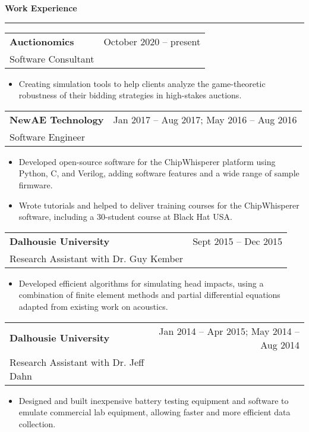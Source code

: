 \documentclass{article}
\newcommand{\heading}[1]
{
	\vspace{3pt}
	\textbf{#1} 
	\vspace{-6pt}
	
	\rule{\linewidth}{0.4pt}
}
\begin{document}
\clearpage
\heading{Work Experience}
\begin{center}
	\begin{tabularx}{\textwidth}{Xr}
		\textbf{Auctionomics}		& October 2020 -- present \\
		Software Consultant
	\end{tabularx}
	\end{center}
	\begin{itemize}
		\item Creating simulation tools to help clients analyze the game-theoretic robustness of their bidding strategies in high-stakes auctions.
	\end{itemize}

\begin{center}
\begin{tabularx}{\textwidth}{Xr}
	\textbf{NewAE Technology}		& Jan 2017 -- Aug 2017; May 2016 -- Aug 2016 \\
	Software Engineer
\end{tabularx}
\end{center}
\begin{itemize}
	\item Developed open-source software for the ChipWhisperer platform using Python, C, and Verilog, adding software features and a wide range of sample firmware.
	\item Wrote tutorials and helped to deliver training courses for the ChipWhisperer software, including a 30-student course at Black Hat USA.
\end{itemize}

\begin{center}
\begin{tabularx}{\textwidth}{Xr}
	\textbf{Dalhousie University}	& Sept 2015 -- Dec 2015 \\
	Research Assistant with Dr. Guy Kember
\end{tabularx}
\end{center}
\begin{itemize}
	\item Developed efficient algorithms for simulating head impacts, using a combination of finite element methods and partial differential equations adapted from existing work on acoustics.
\end{itemize}

\begin{center}
\begin{tabularx}{\textwidth}{Xr}
	\textbf{Dalhousie University}	& 
	Jan 2014 -- Apr 2015; May 2014 -- Aug 2014 \\
	Research Assistant with Dr. Jeff Dahn
\end{tabularx}
\end{center}
\begin{itemize}
	\item Designed and built inexpensive battery testing equipment and software to emulate commercial lab equipment, allowing faster and more efficient data collection.
\end{itemize}
\end{document}
